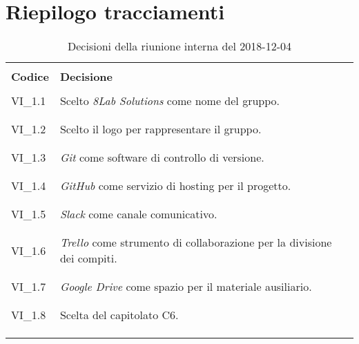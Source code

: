 \section{Riepilogo tracciamenti}
\begin{centering}
\begin{longtable}{ >{\centering}p{4cm} >{\centering}p{11cm} }

\hline
\\[0.5pt]
	\textbf{Codice} & \textbf{Decisione} 
	
	\tabularnewline 
	\hline
	
	
				\\[0.5pt]
				VI\_1.1 & Scelto \textit{8Lab Solutions} come nome del gruppo.
				\\[0.5pt]
				\tabularnewline
				\hline
						
				\\[0.5pt]
				VI\_1.2 & Scelto il logo per rappresentare il gruppo.
				\\[0.5pt]
				\tabularnewline
				\hline
				
				\\[0.5pt]
				VI\_1.3 & \textit{Git} come software di controllo di versione.
				\\[0.5pt]
				\tabularnewline
				\hline
				
				\\[0.5pt]				
				VI\_1.4 & \textit{GitHub} come servizio di hosting per il progetto.
				\\[0.5pt]
				\tabularnewline
				\hline
				
				\\[0.5pt]
				VI\_1.5 & \textit{Slack} come canale comunicativo.
				\\[0.5pt]
				\tabularnewline
				\hline
				
				\\[0.5pt]
				VI\_1.6 & \textit{Trello} come strumento di collaborazione per la divisione 
				dei compiti.
				\\[0.5pt]
				\tabularnewline
				\hline
		
				\\[0.5pt]
				VI\_1.7 & \textit{Google Drive} come spazio per il materiale ausiliario.
				\\[0.5pt]
				\tabularnewline
				\hline
			
				\\[0.5pt]
				VI\_1.8 & Scelta del capitolato C6.
				\\[0.5pt]
				\tabularnewline
              	\hline 
           	
                
        \\[0.7pt]
        \caption{Decisioni della riunione interna del 2018-12-04}
\end{longtable}
\end{centering}

